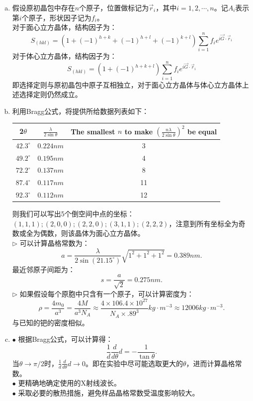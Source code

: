 \documentclass[reqno,a4paper,12pt]{amsart}
\begin{document}
\begin{enumerate}[1.]
\begin{tcolorbox}[breakable, colback = black!5!white, colframe = black]
\begin{enumerate}[(a)]
\item 假设原初晶包中存在$n$个原子，位置做标记为$\vec{r}_i$，其中$i=1,2,\cdots,n$。记$A_i$表示第$i$个原子，形状因子记为$f_i$。 \\
对于面心立方晶体，结构因子为：
\[
	S_{(hkl)} = (1 + (-1)^{h+k} + (-1)^{h+l} + (-1)^{k+l})\sum_{i=1}^n f_i e^{i\vec{G}\cdot\vec{r}_i}
\]
对于体心立方晶体，结构因子为：
\[
	S_{(hkl)} = (1 + (-1)^{h+k+l})\sum_{i=1}^n f_i e^{i\vec{G}\cdot\vec{r}_i}
\]
即选择定则与原初晶包中原子互相独立，对于面心立方晶体与体心立方晶体上述选择定则仍然成立。 

\item 利用Bragg公式，将提供所给数据列表如下：
\begin{table}[H]
	\centering
	\begin{tabular}{|c|c|c|}
	\hline
	2$\theta$ & $\frac{\lambda}{2\sin\theta}$ & The smallest $n$ to make $\left(\frac{n\lambda}{2\sin\theta}\right)^2$ be equal \\ \hline
	$42.3^{\circ}$ & $0.224nm$ & 3 \\ \hline
	$49.2^{\circ}$ & $0.195nm$ & 4 \\ \hline
	$72.2^{\circ}$ & $0.137nm$ & 8 \\ \hline
	$87.4^{\circ}$ & $0.117nm$ & 11 \\ \hline
	$92.3^{\circ}$ & $0.112nm$ & 12 \\ \hline
	\end{tabular}
\end{table}
则我们可以写出5个倒空间中点的坐标：$(1,1,1);(2,0,0);(2,2,0);(3,1,1);(2,2,2)$，注意到所有坐标全为奇数或全为偶数，则该晶体为面心立方晶体。 \\
$\triangleright$ 可以计算晶格常数为：
\[
	a = \frac{\lambda}{2\sin(21.15^\circ)} \sqrt{1^2+1^2+1^2} = 0.389nm.
\]
最近邻原子间距为：
\[
	s = \frac{a}{\sqrt{2}} = 0.275nm.
\]
$\triangleright$ 如果假设每个原胞中只含有一个原子，可以计算密度为：
\[
	\rho = \frac{4m_0}{a^3} = \frac{4M}{a^3N_A} \approx \frac{4\times106.4\times10^{27}}{N_A\times.89^3}kg\cdot m^{-3} \approx 12006 kg\cdot m^{-3}.
\]
与已知的钯的密度相似。 \\

\item $\bullet$ 根据Bragg公式，可以计算得：
\[
	\frac{1}{d}\frac{d}{d\theta}d = -\frac{1}{\tan\theta}.
\]
当$\theta \to \pi/2$时，$\frac{1}{d}\frac{d}{d\theta}d \to 0$。即在实验中尽可能选取更大的$\theta$，进而计算晶格常数。 \\
$\bullet$ 更精确地确定使用的X射线波长。 \\
$\bullet$ 采取必要的散热措施，避免样品晶格常数受温度影响较大。
\end{enumerate}
\end{tcolorbox}


\end{enumerate}
\end{document}
